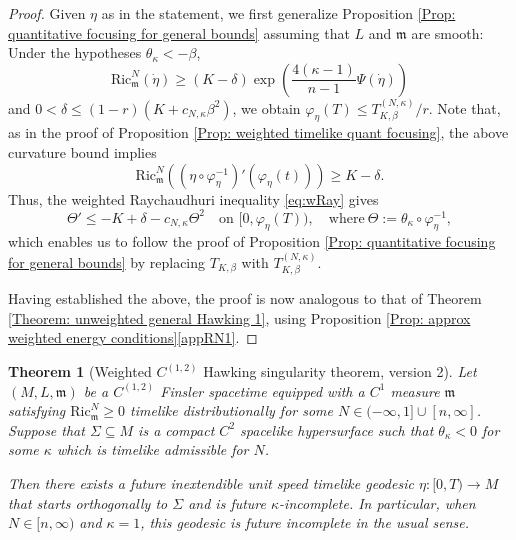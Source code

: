 \documentclass[a4paper,11pt]{article}
\numberwithin{equation}{section}
\theoremstyle{definition}
\theoremstyle{plain}
\newtheorem{Theorem}[Definition]{Theorem}
\newcommand{\Ric}{\mathrm{Ric}}
\newcommand{\m}{\mathfrak m}
\begin{document}
\begin{proof}
Given $\eta$ as in the statement, we first generalize Proposition \ref{Prop: quantitative focusing for general bounds} assuming that $L$ and $\m$ are smooth:
Under the hypotheses $\theta_\kappa <-\beta$,
\[
\Ric^N_\m (\dot{\eta}) \ge (K-\delta) \exp\left(
        \frac{4(\kappa-1)}{n-1}\Psi(\dot\eta)
    \right)
\]
and $0<\delta \le (1-r)(K+c_{N,\kappa}\beta^2)$, we obtain
$\varphi_\eta(T) \leq T^{(N,\kappa)}_{K,\beta}/r$.
Note that, as in the proof of Proposition \ref{Prop: weighted timelike quant focusing}, the above curvature bound implies
\[
\Ric^N_\m \left(
        (\eta\circ\varphi_\eta^{-1})'
        (\varphi_\eta(t))
    \right) \geq K-\delta.
\]
Thus, the weighted Raychaudhuri inequality \eqref{eq:wRay} gives
\[
    \Theta' \leq -K+\delta-c_{N,\kappa}\Theta^2
    \quad\text{on }[0,\varphi_\eta(T)),
    \quad \text{where}\ \Theta:=\theta_\kappa \circ \varphi_{\eta}^{-1},
\]
which enables us to follow the proof of Proposition \ref{Prop: quantitative focusing for general bounds} by replacing $T_{K,\beta}$ with $T^{(N,\kappa)}_{K,\beta}$.

Having established the above, the proof is now analogous to that of Theorem \ref{Theorem: unweighted general Hawking 1}, using Proposition \ref{Prop: approx weighted energy conditions}\ref{appRN1}.
\end{proof}

\begin{Theorem}[Weighted $C^{(1,2)}$ Hawking singularity theorem, version 2]
\label{Theorem: Weighted Hawking 2}
Let $(M,L,\mathfrak m)$ be a $C^{(1,2)}$ Finsler spacetime equipped with a $C^1$ measure $\mathfrak m$ satisfying $\Ric^N_{\mathfrak m}\geq0$ timelike distributionally for some $N\in(-\infty,1]\cup[n,\infty]$.
Suppose that $\Sigma\subseteq M$ is a compact $C^2$ spacelike hypersurface such that $\theta_\kappa<0$ for some $\kappa$ which is timelike admissible for $N$.

Then there exists a future inextendible unit speed timelike geodesic $\eta:[0,T)\to M$ that starts orthogonally to $\Sigma$ and is future $\kappa$-incomplete.
In particular, when $N\in[n,\infty)$ and $\kappa=1$, this geodesic is future incomplete in the usual sense.
\end{Theorem}
\end{document}
